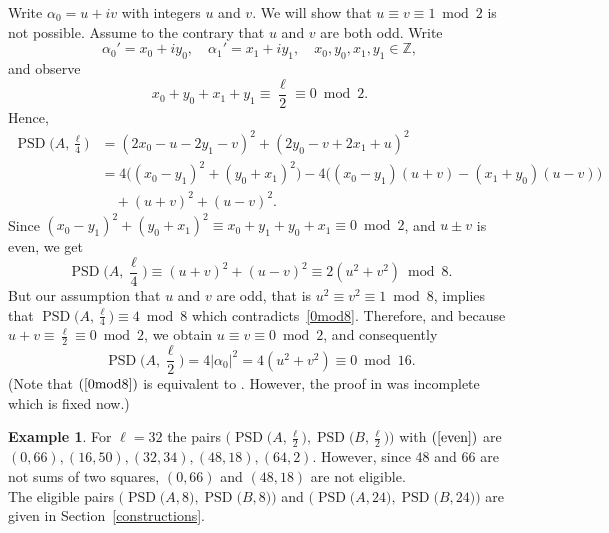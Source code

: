 \documentclass{article}
\theoremstyle{definition}
\newtheorem{example}[theorem]{Example}
\newcommand{\DFT}{\operatorname{DFT}}
\newcommand{\PSD}{\operatorname{PSD}}
\begin{document}
Write $\alpha_0=u+iv$ with integers $u$ and $v$. We will show that $u\equiv v\equiv 1\bmod 2$ is not possible.
Assume to the contrary that $u$ and $v$ are both odd. Write 
$$\alpha_0'=x_0+iy_0, \quad \alpha_1'=x_1+iy_1,\quad x_0,y_0,x_1,y_1\in \mathbb{Z},$$
and observe
$$x_0+y_0+x_1+y_1\equiv \frac{\ell}{2}\equiv 0\bmod 2.$$
Hence, 
\begin{align*}
    \PSD\biggl(A,\frac{\ell}{4}\biggr) &= (2x_0-u-2y_1-v)^2+(2y_0-v+2x_1+u)^2\\
    &= 4\bigl((x_0-y_1)^2+(y_0+x_1)^2\bigr)
    -4\bigr((x_0-y_1)(u+v)-(x_1+y_0)(u-v)\bigl)\\
    &\quad +(u+v)^2+(u-v)^2.
\end{align*}
Since
$(x_0-y_1)^2+(y_0+x_1)^2\equiv x_0+y_1+y_0+x_1\equiv 0\bmod 2$, and $u\pm v$ is even, we get
$$\PSD\biggl(A,\frac{\ell}{4}\biggr)\equiv(u+v)^2+(u-v)^2\equiv 2(u^2+v^2)\bmod 8.$$
But our assumption that $u$ and $v$ are odd, that is $u^2\equiv v^2\equiv 1\bmod 8$, implies that $\PSD\bigl(A,\frac{\ell}{4}\bigr)\equiv 4\bmod 8$
which contradicts~\eqref{0mod8}. Therefore, and because $u+v\equiv \frac{\ell}{2}\equiv 0\bmod 2$, we obtain $u\equiv v\equiv 0\bmod 2$, and consequently
\begin{equation}\label{even}
\PSD\biggl(A,\frac{\ell}{2}\biggr)=4|\alpha_0|^2=4(u^2+v^2)\equiv 0\bmod 16.
\end{equation}
(Note that $(\ref{0mod8})$ is equivalent to \cite[Theorem 3.2]{kw24}. However, the proof in \cite{kw24} was incomplete which is fixed now.) \\

\begin{example}
For $\ell=32$ the pairs $\bigl(\PSD\bigl(A,\frac{\ell}{2}\bigr),\PSD\bigl(B,\frac{\ell}{2}\bigr)\bigr)$
with $(\ref{even})$ are $(0,66),(16,50),(32,34),(48,18),(64,2)$. However, since $48$ and $66$ are not sums of two squares, $(0,66)$ and $(48,18)$ are not eligible.\\
The eligible pairs $\bigl(\PSD\bigl(A,8\bigr),\PSD\bigl(B,8\bigr)\bigr)$ and $\bigl(\PSD\bigl(A,24\bigr),\PSD\bigl(B,24\bigr)\bigr)$ are given in Section~\ref{constructions}.
\end{example}
\end{document}
